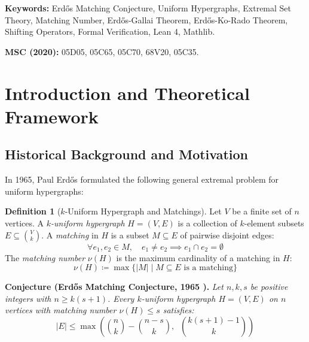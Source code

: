 \documentclass[11pt,a4paper]{article}
\theoremstyle{definition}
\newtheorem{definition}[theorem]{Definition}
\begin{document}
\vspace{0.5em}
\noindent\textbf{Keywords:} Erd\H{o}s Matching Conjecture, Uniform Hypergraphs, Extremal Set Theory, Matching Number, Erd\H{o}s-Gallai Theorem, Erd\H{o}s-Ko-Rado Theorem, Shifting Operators, Formal Verification, Lean 4, Mathlib.

\noindent\textbf{MSC (2020):} 05D05, 05C65, 05C70, 68V20, 05C35.

\tableofcontents
\newpage

\section{Introduction and Theoretical Framework}

\subsection{Historical Background and Motivation}
In 1965, Paul Erd\H{o}s \cite{erdos1965matching} formulated the following general extremal problem for uniform hypergraphs:

\begin{definition}[$k$-Uniform Hypergraph and Matchings]\label{def:hypergraph}
Let $V$ be a finite set of $n$ vertices.
A \emph{$k$-uniform hypergraph} $H = (V, E)$ is a collection of $k$-element subsets $E \subseteq \binom{V}{k}$.
A \emph{matching} in $H$ is a subset $M \subseteq E$ of pairwise disjoint edges:
\begin{equation}\label{eq:matching_def}
\forall e_1, e_2 \in M, \quad e_1 \ne e_2 \implies e_1 \cap e_2 = \emptyset
\end{equation}
The \emph{matching number} $\nu(H)$ is the maximum cardinality of a matching in $H$:
\begin{equation}\label{eq:matching_num}
\nu(H) \coloneqq \max \{ |M| \mid M \subseteq E \text{ is a matching} \}
\end{equation}
\end{definition}

\noindent\textbf{Conjecture (Erd\H{o}s Matching Conjecture, 1965 \cite{erdos1965matching}).} \textit{Let $n, k, s$ be positive integers with $n \ge k(s + 1)$.
Every $k$-uniform hypergraph $H = (V, E)$ on $n$ vertices with matching number $\nu(H) \le s$ satisfies:}
\begin{equation}\label{eq:emc_bound}
|E| \le \max\left( \binom{n}{k} - \binom{n - s}{k}, \;\; \binom{k(s + 1) - 1}{k} \right)
\end{equation}
\end{document}
